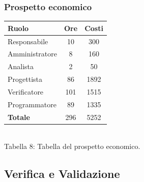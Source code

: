 \subsubsection{Prospetto economico}
\begin{center}
\begin{tabular}{| l | c | c |}
\hline
Ruolo & Ore & Costi \\
\hline
Responsabile & 10 & 300 \\
Amministratore & 8 & 160 \\
Analista & 2 & 50 \\
Progettista & 86 & 1892 \\
Verificatore & 101 & 1515 \\
Programmatore & 89 & 1335 \\
\hline
\textbf{Totale} & 296 & 5252 \\
\hline
\end{tabular}
\\
Tabella 8: Tabella del prospetto economico.
\end{center}
\subsection{Verifica e Validazione}
